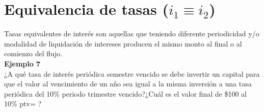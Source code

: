 \section{Equivalencia de tasas ($i_{1} \equiv i_{2}$)}

Tasas equivalentes de interés son aquellas que teniendo diferente periodicidad y/o modalidad de liquidación de intereses producen el mismo monto al final o al comienzo del flujo.\\

\textbf{Ejemplo 7}\\

¿A qué tasa de interés periódica semestre vencido se debe invertir un capital para que el valor al vencimiento de un año sea igual a la misma inversión a una tasa periódica del 10\% periodo trimestre vencido?¿Cuál es el valor final  de \$100 al 10\% ptv= ? 
